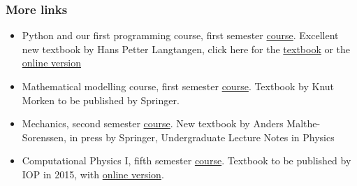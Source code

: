 \documentclass{beamer}
\begin{document}
\begin{frame}
\frametitle{More links}

\begin{block}{}
\begin{itemize}
\item Python and our first programming course, first semester \href{{http://www.uio.no/studier/emner/matnat/ifi/INF1100/h14/}}{course}. Excellent new textbook by Hans Petter Langtangen, click here for the \href{{http://www.amazon.com/Scientific-Programming-Computational-Science-Engineering-ebook/dp/B00DGER1NQ/ref=sr_1_2?ie=UTF8&qid=1425382942&sr=8-2&keywords=langtangen}}{textbook} or the \href{{http://hplgit.github.io/primer.html/doc/web/index.html}}{online version}

\item Mathematical modelling course, first semester \href{{http://www.uio.no/studier/emner/matnat/math/MAT-INF1100/h14/}}{course}. Textbook by Knut Morken to be published by Springer.

\item Mechanics, second semester \href{{http://www.uio.no/studier/emner/matnat/fys/FYS-MEK1100/v12/}}{course}. New textbook by Anders Malthe-Sorenssen, in press by Springer, Undergraduate Lecture Notes in Physics

\item Computational Physics I, fifth semester \href{{http://www.uio.no/studier/emner/matnat/fys/FYS3150/h14/}}{course}. Textbook to be published by IOP in 2015, with \href{{http://www.uio.no/studier/emner/matnat/fys/FYS3150/h14/undervisningsmateriale/Lecture%20Notes/lecture2014.pdf}}{online version}.
\end{itemize}

\noindent
\end{block}
\end{frame}
\end{document}

